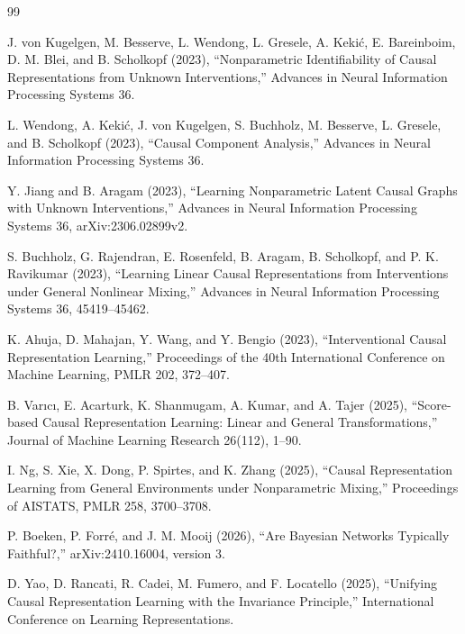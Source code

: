 \documentclass{article}
\begin{document}
\begin{thebibliography}{99}

   J. von Kugelgen, M. Besserve, L. Wendong, L. Gresele, A. Keki\'c, E. Bareinboim, D. M. Blei, and B. Scholkopf (2023), ``Nonparametric Identifiability of Causal Representations from Unknown Interventions,'' Advances in Neural Information Processing Systems 36.

   L. Wendong, A. Keki\'c, J. von Kugelgen, S. Buchholz, M. Besserve, L. Gresele, and B. Scholkopf (2023), ``Causal Component Analysis,'' Advances in Neural Information Processing Systems 36.

   Y. Jiang and B. Aragam (2023), ``Learning Nonparametric Latent Causal Graphs with Unknown Interventions,'' Advances in Neural Information Processing Systems 36, arXiv:2306.02899v2.

   S. Buchholz, G. Rajendran, E. Rosenfeld, B. Aragam, B. Scholkopf, and P. K. Ravikumar (2023), ``Learning Linear Causal Representations from Interventions under General Nonlinear Mixing,'' Advances in Neural Information Processing Systems 36, 45419--45462.

   K. Ahuja, D. Mahajan, Y. Wang, and Y. Bengio (2023), ``Interventional Causal Representation Learning,'' Proceedings of the 40th International Conference on Machine Learning, PMLR 202, 372--407.

   B. Var\i{}c\i{}, E. Acarturk, K. Shanmugam, A. Kumar, and A. Tajer (2025), ``Score-based Causal Representation Learning: Linear and General Transformations,'' Journal of Machine Learning Research 26(112), 1--90.

   I. Ng, S. Xie, X. Dong, P. Spirtes, and K. Zhang (2025), ``Causal Representation Learning from General Environments under Nonparametric Mixing,'' Proceedings of AISTATS, PMLR 258, 3700--3708.

   P. Boeken, P. Forr\'e, and J. M. Mooij (2026), ``Are Bayesian Networks Typically Faithful?,'' arXiv:2410.16004, version 3.

   D. Yao, D. Rancati, R. Cadei, M. Fumero, and F. Locatello (2025), ``Unifying Causal Representation Learning with the Invariance Principle,'' International Conference on Learning Representations.


\end{thebibliography}
\end{document}

